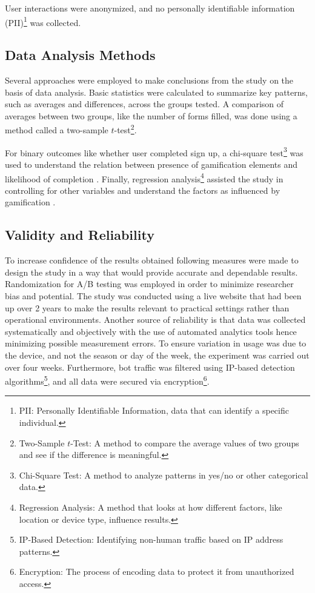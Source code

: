 \documentclass[conference]{IEEEtran}
\begin{document}
User interactions were anonymized, and no personally identifiable information (PII)\footnote{PII: Personally Identifiable Information, data that can identify a specific individual.} was collected.

\subsection{Data Analysis Methods}

Several approaches were employed to make conclusions from the study on the basis of data analysis. Basic statistics were calculated to summarize key patterns, such as averages and differences, across the groups tested. A comparison of averages between two groups, like the number of forms filled, was done using a method called a two-sample \( t \)-test\footnote{Two-Sample \( t \)-Test: A method to compare the average values of two groups and see if the difference is meaningful.}\cite{statology_ttest_anova}.

For binary outcomes like whether user completed sign up, a chi-square test\footnote{Chi-Square Test: A method to analyze patterns in yes/no or other categorical data.} was used to understand the relation between presence of gamification elements and likelihood of completion \cite{builtin_ttest_chisquare}. Finally, regression analysis\footnote{Regression Analysis: A method that looks at how different factors, like location or device type, influence results.} assisted the study in controlling for other variables and understand the factors as influenced by gamification \cite{psu_regression}.

\subsection{Validity and Reliability}

To increase confidence of the results obtained following measures were made to design the study in a way that would provide accurate and dependable results. Randomization for A/B testing was employed in order to minimize researcher bias and potential. The study was conducted using a live website that had been up over 2 years to make the results relevant to practical settings rather than operational environments. Another source of reliability is that data was collected systematically and objectively with the use of automated analytics tools hence minimizing possible measurement errors. To ensure variation in usage was due to the device, and not the season or day of the week, the experiment was carried out over four weeks. Furthermore, bot traffic was filtered using IP-based detection algorithms\footnote{IP-Based Detection: Identifying non-human traffic based on IP address patterns.}, and all data were secured via encryption\footnote{Encryption: The process of encoding data to protect it from unauthorized access.}.
\end{document}
